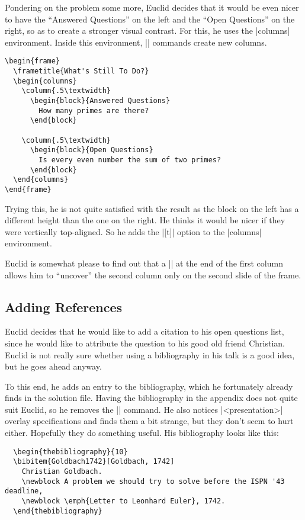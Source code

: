 Pondering on the problem some more, Euclid decides that it would be even nicer to have the ``Answered Questions'' on the left and the ``Open Questions'' on the right, so as to create a stronger visual contrast. For this, he uses the |columns| environment. Inside this environment, |\column| commands create new columns.
\begin{verbatim}
\begin{frame}
  \frametitle{What's Still To Do?}
  \begin{columns}
    \column{.5\textwidth}
      \begin{block}{Answered Questions}
        How many primes are there?
      \end{block}

    \column{.5\textwidth}
      \begin{block}{Open Questions}
        Is every even number the sum of two primes?
      \end{block}
  \end{columns}
\end{frame}
\end{verbatim}

Trying this, he is not quite satisfied with the result as the block on the left has a different height than the one on the right. He thinks it would be nicer if they were vertically top-aligned. So he adds the |[t]| option to the |columns| environment.

Euclid is somewhat please to find out that a |\pause| at the end of the first column allows him to ``uncover'' the second column only on the second slide of the frame.


\subsection{Adding References}

Euclid decides that he would like to add a citation to his open questions list, since he would like to attribute the question to his good old friend Christian. Euclid is not really sure whether using a bibliography in his talk is a good idea, but he goes ahead anyway.

To this end, he adds an entry to the bibliography, which he fortunately already finds in the solution file. Having the bibliography in the appendix does not quite suit Euclid, so he removes the |\appendix| command. He also notices |<presentation>| overlay specifications and finds them a bit strange, but they don't seem to hurt either. Hopefully they do something useful. His bibliography looks like this:
\begin{verbatim}
  \begin{thebibliography}{10}
  \bibitem{Goldbach1742}[Goldbach, 1742]
    Christian Goldbach.
    \newblock A problem we should try to solve before the ISPN '43 deadline,
    \newblock \emph{Letter to Leonhard Euler}, 1742.
  \end{thebibliography}
\end{verbatim}


